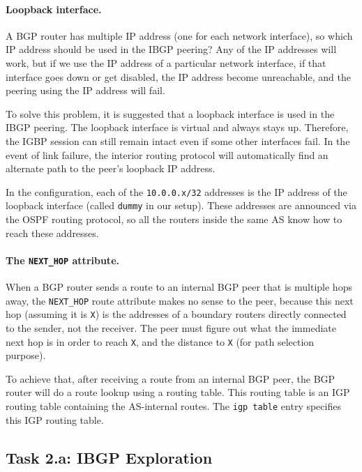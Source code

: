 \paragraph{Loopback interface.}
A BGP router has multiple IP address (one for each network interface), so which IP address
should be used in the IBGP peering? Any of the IP addresses will work, but 
if we use the IP address of a particular network interface, if that interface 
goes down or get disabled, the IP address become unreachable, and the 
peering using the IP address will fail. 

To solve this problem, it is suggested that a loopback interface is used 
in the IBGP peering. The loopback interface is virtual and always stays up. 
Therefore, the IGBP session can still remain intact even if some other 
interfaces fail. In the event of link failure, the interior routing 
protocol will automatically find an alternate path to the peer's loopback
IP address. 

In the configuration, each of the \texttt{10.0.0.x/32} addresses is 
the IP address of the loopback interface (called \texttt{dummy} in our setup). 
These addresses are announced via the OSPF routing protocol, so all the 
routers inside the same AS know how to reach these addresses. 



\paragraph{The \texttt{NEXT\_HOP} attribute.}
When a BGP router sends a route to an internal BGP peer that is multiple hops
away, the \texttt{NEXT\_HOP} route attribute makes no sense to the peer, 
because this next hop (assuming it is \texttt{X}) is the addresses of a 
boundary routers directly connected to the sender, not the receiver. 
The peer must figure out what the immediate next hop is in order to reach \texttt{X}, 
and the distance to \texttt{X} (for path selection purpose). 

To achieve that, after receiving a route from an internal BGP peer,
the BGP router will do a route lookup using a routing table.
This routing table is an IGP routing table containing the AS-internal routes. 
The \texttt{igp table} entry specifies this IGP routing table. 



\subsection{Task 2.a: IBGP Exploration} 



